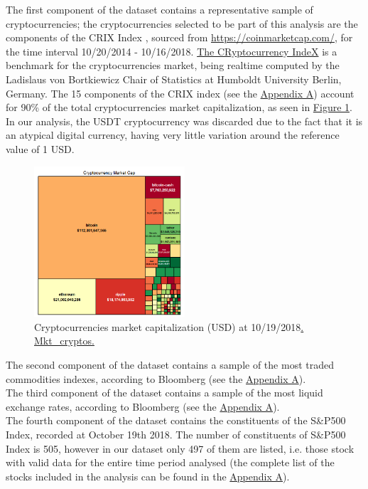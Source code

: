 The first component of the dataset contains a representative sample of cryptocurrencies; the cryptocurrencies selected to be part of this analysis are the components of the CRIX Index \citep{Hardle.2018}, sourced from \url{https://coinmarketcap.com/}, for the time interval 10/20/2014 - 10/16/2018. \href{http://thecrix.de/}{The CRyptocurrency IndeX} is a benchmark for the cryptocurrencies market, being realtime computed by the Ladislaus von Bortkiewicz Chair of Statistics at Humboldt University Berlin, Germany. The 15 components of the CRIX index (see the \hyperref[appendix:a]{Appendix A}) account for 90\% of the total cryptocurrencies market capitalization, as seen in \hyperref[fig:figure_1]{Figure 1}. In our analysis, the USDT cryptocurrency was discarded due to the fact that it is an atypical digital currency, having very little variation around the reference value of 1 USD.
\begin{figure}[H]
	\centering
	\includegraphics[width=0.5\textwidth]{Fig/figure_1.png}
	\caption{Cryptocurrencies market capitalization (USD) at 10/19/2018\href{https://github.com/QuantLet/Genus_proximum_cryptos/tree/master/Mkt_Cryptos}{. Mkt\_cryptos.}}
	\label {fig:figure_1}
\end{figure}

The second component of the dataset contains a sample of the most traded commodities indexes, according to Bloomberg (see the \hyperref[appendix:a]{Appendix A}).\\
\indent The third component of the dataset contains a sample of the most liquid exchange rates, according to Bloomberg (see the \hyperref[appendix:a]{Appendix A}).\\
\indent The fourth component of the dataset contains the constituents of the S\&P500 Index, recorded at October 19th 2018. The number of constituents of S\&P500 Index is 505, however in our dataset only 497 of them are listed, i.e. those stock with valid data for the entire time period analysed (the complete list of the stocks included in the analysis can be found in the \hyperref[appendix:a]{Appendix A}).


